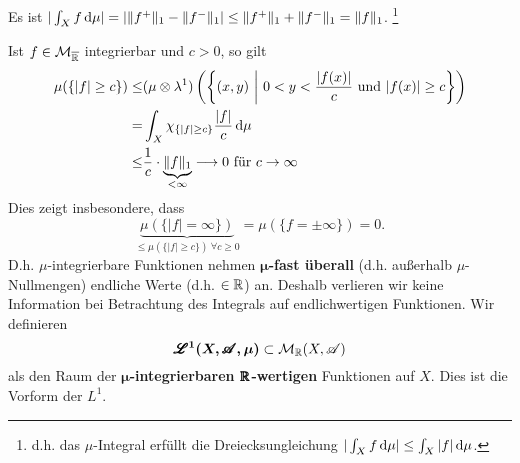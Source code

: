 \begin{beobachtung}
Es ist $|\int_X f\, \mathrm{d} \mu| = | \|f^+\|_1 - \|f^-\|_1|\leq \|f^+\|_1+\|f^-\|_1=\|f\|_1$. \footnote{d.h. das $\mu$-Integral erfüllt die Dreiecksungleichung $|\int_X f\, \mathrm{d}\mu|\leq \int_X |f|\, \mathrm{d}\mu$.}
\end{beobachtung}
Ist $f\in \mathcal{M}_{\overline{\mathbb{R}}}$ integrierbar und $c>0$, so gilt
\begin{equation*}
\begin{split}
\mu (\{|f|\geq c\}) \leq & (\mu \otimes \lambda^1) \left( \left\{ \left(x, y\right)\, \bigg\vert \  0<y<\frac{|f(x)|}{c} \text{ und } |f(x)|\geq c	\right\}\right)\\
= & \int_X \chi_{\{|f|\geq c\}}\frac{|f|}{c}\, \mathrm{d}\mu  \\
\leq & \frac{1}{c}\cdot \underbrace{\|f\|_1}_{<\infty} \longrightarrow 0 \text{ für } c\to \infty
\end{split}
\end{equation*}
Dies zeigt insbesondere, dass
$$
\underbrace{\mu( \{   |f|=\infty \} )}_{\leq \mu( \{ |f|\geq c \} ) \ \forall c\geq 0} = \mu(\{  f=\pm \infty  \}) =0.
$$
D.h. $\mu$-integrierbare Funktionen nehmen $\boldsymbol\mu$\textbf{-fast überall} (d.h. außerhalb $\mu$-Nullmengen) endliche Werte (d.h. $\in\mathbb{R}$) an. Deshalb verlieren wir keine Information bei Betrachtung des Integrals auf endlichwertigen Funktionen. Wir definieren
$$\boldsymbol{\pmb{\mathscr{L}}^1 (X,\pmb{\mathscr{A}},\mu)} \subset \mathcal{M}_{\mathbb{R}} (X,\mathscr{A})$$
als den Raum der \textbf{$\boldsymbol\mu$-integrierbaren $\pmb{\mathbb{R}}$-wertigen} Funktionen auf $X$. Dies ist die Vorform der $L^1$.

